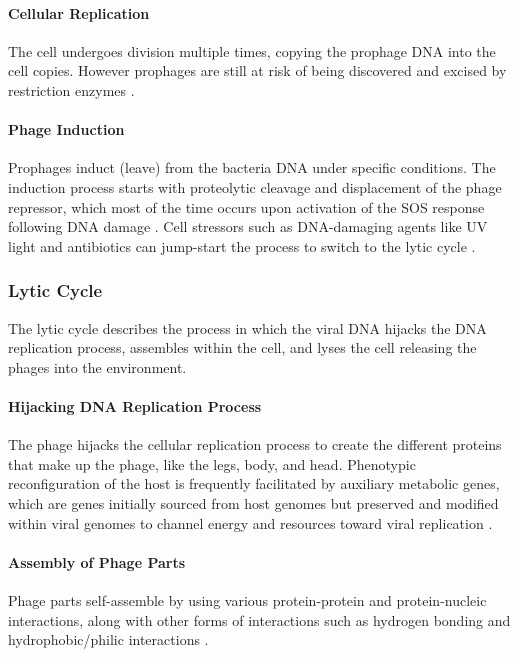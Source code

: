 \paragraph{Cellular Replication}
The cell undergoes division multiple times, copying the prophage DNA into the cell copies. 
However prophages are still at risk of being discovered and excised by restriction enzymes \cite{sharpMolecularEvolutionBacteriophages1986}. 
\paragraph{Phage Induction}
Prophages induct (leave) from the bacteria DNA under specific conditions. 
The induction process starts with proteolytic cleavage and displacement of the phage repressor, which most of the time occurs upon activation of the SOS response following DNA damage \cite{waldorPhageRegulatoryCircuits2005}. 
Cell stressors such as DNA-damaging agents like UV light and antibiotics can jump-start the process to switch to the lytic cycle \cite{stoneUnderstandingExploitingPhage2019, fortierImportanceProphagesEvolution2013}. 

\subsubsection{Lytic Cycle}
The lytic cycle describes the process in which the viral DNA hijacks the DNA replication process, assembles within the cell, and lyses the cell releasing the phages into the environment. 
\paragraph{Hijacking DNA Replication Process}
The phage hijacks the cellular replication process to create the different proteins that make up the phage, like the legs, body, and head. 
Phenotypic reconfiguration of the host is frequently facilitated by auxiliary metabolic genes, which are genes initially sourced from host genomes but preserved and modified within viral genomes to channel energy and resources toward viral replication \cite{warwick-dugdaleHosthijackingPlanktonicPiracy2019}. 
\paragraph{Assembly of Phage Parts}
Phage parts self-assemble by using various protein-protein and protein-nucleic interactions, along with other forms of interactions such as hydrogen bonding and hydrophobic/philic interactions \cite{aksyukBacteriophageAssembly2011}. 
